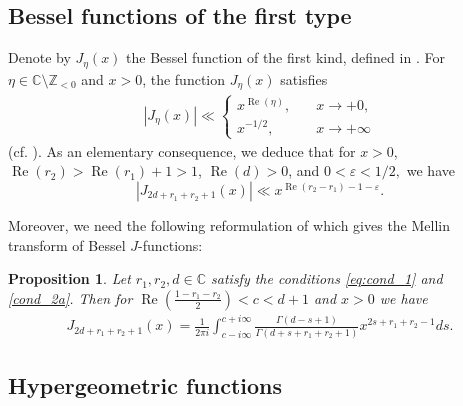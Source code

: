 \documentclass[]{article}
\newtheorem{prop}[thm]{Proposition}
\renewcommand{\Re}{\operatorname{Re}}
\newcommand{\kf}[1]{{\color{magenta}{#1}}}
\begin{document}
\subsection{Bessel functions of the first type}
Denote by \(J_\eta(x)\) the Bessel function of the first kind, defined in \cite[(10.2.2)]{NIST}. For \(\eta \in \mathbb{C} \setminus \mathbb{Z}_{<0}\) and \(x > 0\), the function \(J_\eta(x)\) satisfies 
  \begin{equation}\label{asymp:besselj_skdjflksjdlfjslkdf}
    \begin{split}
      |  J_{\eta} ( x) | \ll
      \begin{cases}
      x^{ \Re (\eta)}, \quad &x \to +  0,\\
    x^{-1/2}, \quad &x \to +\infty  
      \end{cases}
        \end{split}
    \end{equation}
     (cf. \cite[10.7.3, 10.7.8]{NIST}).
As an elementary consequence, we deduce that for $x>0$,   $\Re(r_2) > \Re(r_1) + 1 > 1$, $\Re (d) > 0$, and $0 < \varepsilon < 1/2,$  we have 
    \begin{equation}\label{eq:J_ineq}
     |   J_{2d+r_1+r_2+1} ( x ) | \ll  x^{ \Re (r_2-r_1)-1-\varepsilon}.
    \end{equation}
    
   
Moreover, we need the following  reformulation of \cite[10.9.22]{NIST} which gives the Mellin transform of Bessel $J$-functions:
\begin{prop}
Let $r_1, r_2, d \in \mathbb{C}$ satisfy the conditions \eqref{eq:cond_1} and \eqref{cond_2a}. Then for $ \Re (\frac{1-r_1-r_2}{2} ) < c < d+1$ and $x>0$ we have 
\begin{equation}\label{eq:gamma_mellin_inverstion}
	\begin{split}
J_{2d+r_1+r_2+1} ( x) = 		\frac{1}{2 \pi i} \int_{c-i \infty}^{c+i \infty}   \frac{   \Gamma(d-s+1)  }{\Gamma (d+s+r_1+r_2+1)  }       x^{2s+r_1+r_2-1} ds .
	\end{split}
\end{equation} 
\end{prop}



\subsection{Hypergeometric functions}
\end{document}
